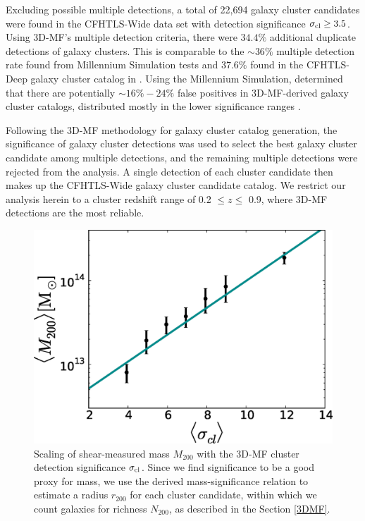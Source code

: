 Excluding possible multiple detections, a total of 22,694 galaxy cluster candidates were found in the \ac{CFHTLS}-Wide data set with detection significance $\sigma_{\rm cl} \ge 3.5$. Using \ac{3D-MF}'s multiple detection criteria, there were $34.4\%$ additional duplicate detections of galaxy clusters. This is comparable to the $\sim 36\%$ multiple detection rate found from Millennium Simulation tests and $37.6\%$ found in the \ac{CFHTLS}-Deep galaxy cluster catalog in \citet{Milkeraitis10}. Using the Millennium Simulation, \citet{Milkeraitis10} determined that there are potentially $\sim 16\%-24\%$ false positives in \ac{3D-MF}-derived galaxy cluster catalogs, distributed mostly in the lower significance ranges \citep[see Table~3 in][]{Milkeraitis10}.

Following the \ac{3D-MF} methodology for galaxy cluster catalog generation, the significance of galaxy cluster detections was used to select the best galaxy cluster candidate among multiple detections, and the remaining multiple detections were rejected from the analysis. A single detection of each cluster candidate then makes up the \ac{CFHTLS}-Wide galaxy cluster candidate catalog. We restrict our analysis herein to a cluster redshift range of 0.2 $\leq z \leq$ 0.9, where \ac{3D-MF} detections are the most reliable.

\begin{figure}
\begin{center}
  \includegraphics[scale=0.7]{plots_ch4/MassSig_relation.eps}
  \caption[Mass-Significance Relation]{Scaling of shear-measured mass $M_{200}$ with the \ac{3D-MF} cluster detection significance $\sigma_{\rm cl}$. Since we find significance to be a good proxy for mass, we use the derived mass-significance relation to estimate a radius $r_{200}$ for each cluster candidate, within which we count galaxies for richness $N_{200}$, as described in the Section \ref{3DMF}.}
\label{plot:masssig} %
\end{center}
\end{figure}

